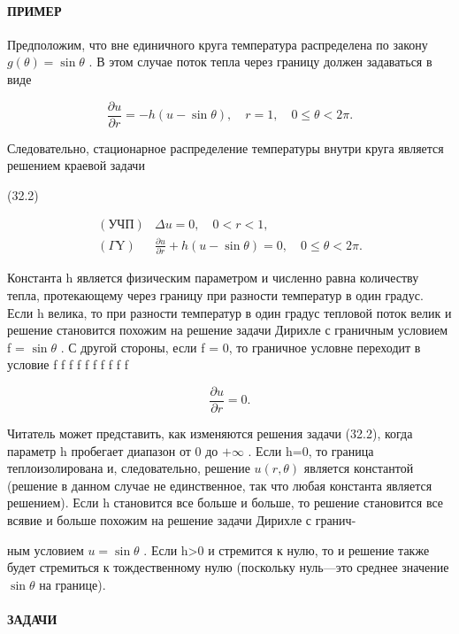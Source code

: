 \documentclass[
  ukrainian,
]{article}
\begin{document}
\paragraph{ПРИМЕР}\label{ux43fux440ux438ux43cux435ux440}

Предположим, что вне единичного круга температура распределена по закону
\(g(\theta) = \sin \theta\) . В этом случае поток тепла через границу
должен задаваться в виде

\[
\frac{\partial u}{\partial r} = -h(u - \sin \theta), \quad r = 1, \quad 0 \le \theta < 2\pi.
\]

Следовательно, стационарное распределение температуры внутри круга
является решением краевой задачи

(32.2)

\[
\begin{array}{llll} (\text{УЧП}) & \Delta u = 0, \quad 0 < r < 1, \\ (\Gamma \text{Y}) & \frac{\partial u}{\partial r} + h \left( u - \sin \theta \right) = 0, \quad 0 \leqslant \theta < 2\pi. \end{array}
\]

Константа h является физическим параметром и численно равна количеству
тепла, протекающему через границу при разности температур в один градус.
Если h велика, то при разности температур в один градус тепловой поток
велик и решение становится похожим на решение задачи Дирихле с граничным
условием f = \(\sin \theta\) . С другой стороны, если f = 0, то
граничное условне переходит в условие f f f f f f f f f f

\[
\frac{\partial u}{\partial r} = 0.
\]

Читатель может представить, как изменяются решения задачи (32.2), когда
параметр h пробегает диапазон от 0 до \(+\infty\) . Если h=0, то граница
теплоизолирована и, следовательно, решение \(u(r,\theta)\) является
константой (решение в данном случае не единственное, так что любая
константа является решением). Если h становится все больше и больше, то
решение становится все всявие и больше похожим на решение задачи Дирихле
с гранич-

ным условием \(u=\sin\theta\) . Если h\textgreater0 и стремится к нулю,
то и решение также будет стремиться к тождественному нулю (поскольку
нуль---это среднее значение \(\sin\theta\) на границе).

\paragraph{ЗАДАЧИ}\label{ux437ux430ux434ux430ux447ux438-7}
\end{document}

